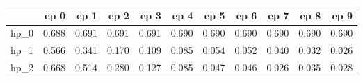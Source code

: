 \begin{tabular}{lrrrrrrrrrr}
\toprule
{} &   ep 0 &   ep 1 &   ep 2 &   ep 3 &   ep 4 &   ep 5 &   ep 6 &   ep 7 &   ep 8 &   ep 9 \\
\midrule
hp\_0 &  0.688 &  0.691 &  0.691 &  0.691 &  0.690 &  0.690 &  0.690 &  0.690 &  0.690 &  0.690 \\
hp\_1 &  0.566 &  0.341 &  0.170 &  0.109 &  0.085 &  0.054 &  0.052 &  0.040 &  0.032 &  0.026 \\
hp\_2 &  0.668 &  0.514 &  0.280 &  0.127 &  0.085 &  0.047 &  0.046 &  0.026 &  0.035 &  0.028 \\
\bottomrule
\end{tabular}
